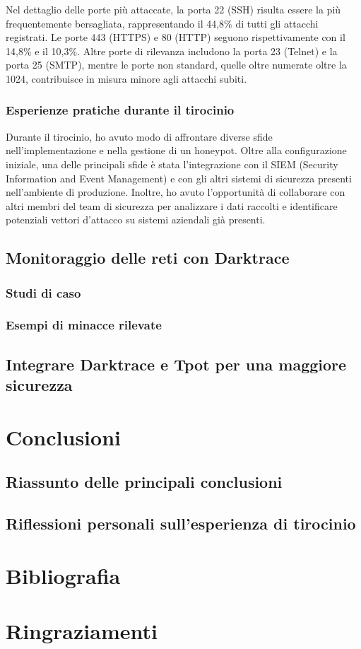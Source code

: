 \documentclass[12pt,a4paper,oneside,onecolumn,openright]{book}
\begin{document}
	Nel dettaglio delle porte più attaccate, la porta 22 (SSH) risulta essere la più frequentemente bersagliata, rappresentando il 44,8\% di tutti gli attacchi registrati. Le porte 443 (HTTPS) e 80 (HTTP) seguono rispettivamente con il 14,8\% e il 10,3\%. Altre porte di rilevanza includono la porta 23 (Telnet) e la porta 25 (SMTP), mentre le porte non standard, quelle oltre numerate oltre la 1024, contribuisce in misura minore agli attacchi subiti.
	
	\subsection{Esperienze pratiche durante il tirocinio}
	Durante il tirocinio, ho avuto modo di affrontare diverse sfide nell'implementazione e nella gestione di un honeypot. Oltre alla configurazione iniziale, una delle principali sfide è stata l'integrazione con il SIEM (Security Information and Event Management) e con gli altri sistemi di sicurezza presenti nell'ambiente di produzione. Inoltre, ho avuto l'opportunità di collaborare con altri membri del team di sicurezza per analizzare i dati raccolti e identificare potenziali vettori d'attacco su sistemi aziendali già presenti.
	
	\section{Monitoraggio delle reti con Darktrace}
	\subsection{Studi di caso}
	
	
	\subsection{Esempi di minacce rilevate}
	
	\section{Integrare Darktrace e Tpot per una maggiore sicurezza}
	
	\chapter{Conclusioni}
	\section{Riassunto delle principali conclusioni}
	\section{Riflessioni personali sull'esperienza di tirocinio}
	
	\chapter{Bibliografia}
	\printbibliography[heading=none]
	
	\chapter{Ringraziamenti}
	
\end{document}
